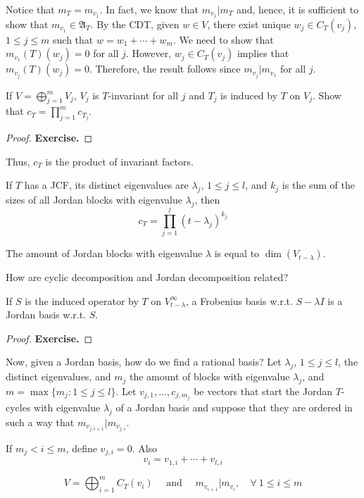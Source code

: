 Notice that $m_T = m_{v_1}$. In fact, we know that $m_{v_1} | m_T$ and, hence, it is sufficient to show that $m_{v_1} \in \mathfrak{A}_T$. By the CDT, given $w \in V$, there exist unique $w_j \in C_T(v_j)$, $1 \leq j \leq m$ such that $w = w_1 + \cdots + w_m$. We need to show that $m_{v_1}(T)(w_j) = 0$ for all $j$. However, $w_j \in C_T(v_j)$ implies that $m_{v_j}(T)(w_j) = 0$. Therefore, the result follows since $m_{v_j} | m_{v_1}$ for all $j$.

\begin{lemma}
	If $V = \bigoplus_{j=1}^m V_j$, $V_j$ is $T$-invariant for all $j$ and $T_j$ is induced by $T$ on $V_j$. Show that $c_T = \prod_{j=1}^m c_{T_j}$.
\end{lemma}

\begin{proof}
	\textbf{Exercise.}
\end{proof}
	
Thus, $c_T$ is the product of invariant factors.

If $T$ has a JCF, its distinct eigenvalues are $\lambda_j$, $1 \leq j \leq l$, and $k_j$ is the sum of the sizes of all Jordan blocks with eigenvalue $\lambda_j$, then
\[
	c_T = \prod_{j=1}^l (t - \lambda_j)^{k_j}
\]

The amount of Jordan blocks with eigenvalue $\lambda$ is equal to $\dim(V_{t-\lambda})$.

How are cyclic decomposition and Jordan decomposition related? 

\begin{lemma}
	If $S$ is the induced operator by $T$ on $V_{t-\lambda}^\infty$, a Frobenius basis w.r.t. $S - \lambda I$ is a Jordan basis w.r.t. $S$.
\end{lemma}

\begin{proof}
	\textbf{Exercise.}
\end{proof}

Now, given a Jordan basis, how do we find a rational basis? Let $\lambda_j$, $1 \leq j \leq l$, the distinct eigenvalues, and $m_j$ the amount of blocks with eigenvalue $\lambda_j$, and $m = \max \{ m_j : 1 \leq j \leq l \}$. Let $v_{j,1}, \ldots, c_{j,m_j}$ be vectors that start the Jordan $T$-cycles with eigenvalue $\lambda_j$ of a Jordan basis and suppose that they are ordered in such a way that $m_{v_{j, i+1}} | m_{v_{j,i}}$.

If $m_j < i \leq m$, define $v_{j,i} = 0$. Also
\[
	v_i = v_{1,i} + \cdots + v_{l,i}
\]

\begin{lemma}
	\[
		V = \bigoplus_{i=1}^m C_T(v_i) \quad \text{ and } \quad m_{v_{i+1}} | m_{v_i}, \quad \forall ~1 \leq i \leq m
	\]
\end{lemma}

